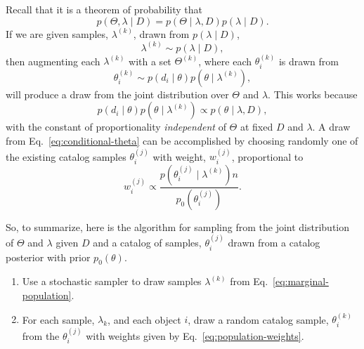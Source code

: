 \documentclass[modern]{aastex63}
\begin{document}
Recall that it is a theorem of probability that
%
\begin{equation}
  \label{eq:joint-conditional-relation}
  p\left( \Theta, \lambda \mid D \right) = p\left( \Theta \mid \lambda, D \right) p\left( \lambda \mid D \right).
\end{equation}
If we are given samples, $\lambda^{(k)}$, drawn from $p\left( \lambda \mid D \right)$,
%
\begin{equation}
  \lambda^{(k)} \sim p\left( \lambda \mid D \right),
\end{equation}
%
then augmenting each $\lambda^{(k)}$ with a set $\Theta^{(k)}$, where each $\theta_i^{(k)}$
is drawn from
%
\begin{equation}
  \label{eq:conditional-theta}
  \theta_i^{(k)} \sim p\left( d_i \mid \theta \right) p\left( \theta \mid \lambda^{(k)} \right),
\end{equation}
%
will produce a draw from the joint distribution over $\Theta$ and $\lambda$.
This works because
%
\begin{equation}
  p\left( d_i \mid \theta \right) p\left( \theta \mid \lambda^{(k)} \right) \propto p\left( \theta \mid \lambda, D \right),
\end{equation}
%
with the constant of proportionality \emph{independent} of $\Theta$ at fixed $D$
and $\lambda$.  A draw from Eq.\ \eqref{eq:conditional-theta} can be
accomplished by choosing randomly one of the existing catalog samples
$\theta_i^{(j)}$ with weight, $w_i^{(j)}$, proportional to \citep{Hogg2010}
%
\begin{equation}
  \label{eq:population-weights}
  w_i^{(j)} \propto \frac{p\left( \theta_i^{(j)} \mid \lambda^{(k)} \right)n}{p_0 \left( \theta_i^{(j)} \right)}.
\end{equation}

So, to summarize, here is the algorithm for sampling from the joint distribution
of $\Theta$ and $\lambda$ given $D$ and a catalog of samples, $\theta_i^{(j)}$
drawn from a catalog posterior with prior $p_0\left(\theta\right)$.
\begin{enumerate}
%
  \item Use a stochastic sampler to draw samples $\lambda^{(k)}$ from Eq.\ \eqref{eq:marginal-population}.
%
  \item For each sample, $\lambda_k$, and each object $i$, draw a random catalog
  sample, $\theta_i^{(k)}$ from the $\theta_i^{(j)}$ with weights given by Eq.\
  \eqref{eq:population-weights}.
%
\end{enumerate}
\end{document}
